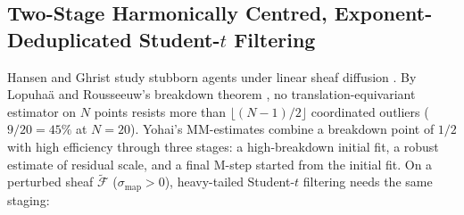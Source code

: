 \documentclass[11pt,a4paper]{article}
\theoremstyle{definition}
\theoremstyle{remark}
\begin{document}
\subsection{\texorpdfstring{Two-Stage Harmonically Centred, Exponent-Deduplicated Student-$t$ Filtering}{Two-Stage Harmonically Centred, Exponent-Deduplicated Student-t Filtering}}

Hansen and Ghrist study stubborn agents under linear sheaf diffusion \cite{hansen2021opinion}. By Lopuha\"a and Rousseeuw's breakdown theorem \cite{lopuhaa1991breakdown}, no translation-equivariant estimator on $N$ points resists more than $\lfloor(N-1)/2\rfloor$ coordinated outliers ($9/20 = 45\%$ at $N=20$). Yohai's MM-estimates \cite{yohai1987high} combine a breakdown point of $1/2$ with high efficiency through three stages: a high-breakdown initial fit, a robust estimate of residual scale, and a final M-step started from the initial fit. On a perturbed sheaf $\widetilde{\mathcal{F}}$ ($\sigma_{\mathrm{map}} > 0$), heavy-tailed Student-$t$ filtering \cite{liu1995ml} needs the same staging:
\end{document}
